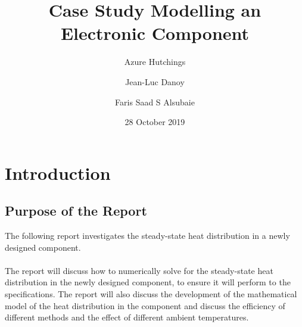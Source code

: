 \documentclass[12pt,a4paper]{article}
\title{Case Study Modelling an Electronic Component}
\author{
  Azure Hutchings
  \and
  Jean-Luc Danoy
  \and
  Faris Saad S Alsubaie
}
\date{28 October 2019}
\begin{document}
 
\begin{titlepage}
\maketitle
\end{titlepage}

\pagebreak

\tableofcontents

\pagebreak

\section{Introduction}

\subsection{Purpose of the Report}
The following report investigates the steady-state heat distribution in a newly designed component. 
\\\\
The report will discuss how to numerically solve for the steady-state heat distribution in the newly designed component, to ensure it will perform to the specifications. The report will also discuss the development of the mathematical model of the heat distribution in the component and discuss the efficiency of different methods and the effect of different ambient temperatures.
\end{document}
